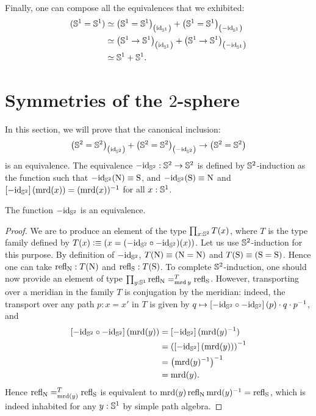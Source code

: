 \documentclass[english,a4paper]{lmcs}
\begin{document}
Finally, one can compose all the equivalences that we exhibited:
\begin{align*}
  ({{\mathbb S^{1}}}={{\mathbb S^{1}}})
  & \simeq {\left({{\mathbb S^{1}}}= {{\mathbb S^{1}}}\right)}_{\left(\mathord{\mathrm{id}}_{{\mathbb S^{1}}}\right)}
    + {\left({{\mathbb S^{1}}} = {{\mathbb S^{1}}}\right)}_{\left(-\mathord{\mathrm{id}}_{{\mathbb S^{1}}}\right)}
  \\
  & \simeq {\left({{\mathbb S^{1}}}\to {{\mathbb S^{1}}}\right)}_{\left(\mathord{\mathrm{id}}_{{\mathbb S^{1}}}\right)}
    + {\left({{\mathbb S^{1}}} \to {{\mathbb S^{1}}}\right)}_{\left(-\mathord{\mathrm{id}}_{{\mathbb S^{1}}}\right)}
  \\
  & \simeq {{\mathbb S^{1}}} + {{\mathbb S^{1}}}.
\end{align*}

\section{Symmetries of the \texorpdfstring{$2$}{2}-sphere}
\label{sec:sphere}

In this section, we will prove that the canonical inclusion:
\begin{equation}
  \label{eq:goal-section-sphere}
  \conncomp{\left(\Sp = \Sp\right)}{\id_\Sp} +
  \conncomp{\left(\Sp = \Sp\right)}{-\id_\Sp}
  \to
  \left(\Sp = \Sp\right)
\end{equation}
is an equivalence. The equivalence $-\mathord{\mathrm{id}}_{{\mathbb S^{2}}} : {{\mathbb S^{2}}} \to {{\mathbb S^{2}}}$ is
defined by ${{\mathbb S^{2}}}$-induction as the function such that
$-\mathord{\mathrm{id}}_{{\mathbb S^{2}}}(\mathrm{N}) \equiv \mathrm{S}$, and $-\mathord{\mathrm{id}}_{{\mathbb S^{2}}}(\mathrm{S}) \equiv \mathrm{N}$ and
$\left[{-\mathord{\mathrm{id}}_{{\mathbb S^{2}}}}\right](\operatorname{\mathrm{mrd}}(x)) = (\operatorname{\mathrm{mrd}}(x))^{-1}$ for all $x:{{\mathbb S^{1}}}$.

\begin{lem}
  The function $-\mathord{\mathrm{id}}_{{\mathbb S^{2}}}$ is an equivalence.
  \label{lem:minus-id-equivalence}
\end{lem}
\begin{proof}
  We are to produce an element of the type $\prod_{x:{{\mathbb S^{2}}}}T(x)$,
  where $T$ is the type family defined by
  $T(x)\vcentcolon\equiv (x= (-\mathord{\mathrm{id}}_{{\mathbb S^{2}}} \circ -\mathord{\mathrm{id}}_{{\mathbb S^{2}}})(x))$.
  Let us use ${{\mathbb S^{2}}}$-induction for this purpose.
  By definition of $-\mathord{\mathrm{id}}_{{\mathbb S^{2}}}$,
  $T(\mathrm{N}) \equiv (\mathrm{N}=\mathrm{N})$
  and $T(\mathrm{S}) \equiv (\mathrm{S}=\mathrm{S})$.
  Hence one can take $\mathop{{\mathrm{refl}}_{\mathrm{N}}}:T(\mathrm{N})$
  and $\mathop{{\mathrm{refl}}_{\mathrm{S}}}:T(\mathrm{S})$.
  To complete ${{\mathbb S^{2}}}$-induction, one should now provide an element
  of type $\prod_{y:{{\mathbb S^{1}}}} \mathop{{\mathrm{refl}}_{\mathrm{N}}} =^{T}_{\operatorname{\mathrm{mrd}} y} \mathop{{\mathrm{refl}}_{\mathrm{S}}}$.
  However,
  transporting over a meridian in the family $T$ is conjugation by the
  meridian: indeed, the transport over any path $p:x=x'$ in $T$ is given by
  $q\mapsto \left[{-\mathord{\mathrm{id}}_{{\mathbb S^{2}}} \circ -\mathord{\mathrm{id}}_{{\mathbb S^{2}}}}\right](p) \cdot q \cdot p^{-1}$, and
  \begin{align*}
    \ap{-\id_\Sp \circ -\id_\Sp} (\mrd(y))
     &= \ap{-\id_\Sp}(\inv {\mrd(y)})
    \\ &= \inv {\left( \ap{-\id_\Sp}(\mrd(y)) \right)}
    \\ &= \inv { \left( \inv{\mrd(y)} \right) }
    \\ &= \mrd(y).
  \end{align*}
  Hence $\mathop{{\mathrm{refl}}_{\mathrm{N}}} =^{T}_{\operatorname{\mathrm{mrd}}(y)} \mathop{{\mathrm{refl}}_{\mathrm{S}}}$
  is equivalent to
  $\operatorname{\mathrm{mrd}}(y)\mathop{{\mathrm{refl}}_{\mathrm{N}}} \operatorname{\mathrm{mrd}}(y)^{-1} = \mathop{{\mathrm{refl}}_{\mathrm{S}}}$, which is indeed inhabited for any
  $y:{{\mathbb S^{1}}}$ by simple path algebra.
\end{proof}
\end{document}
